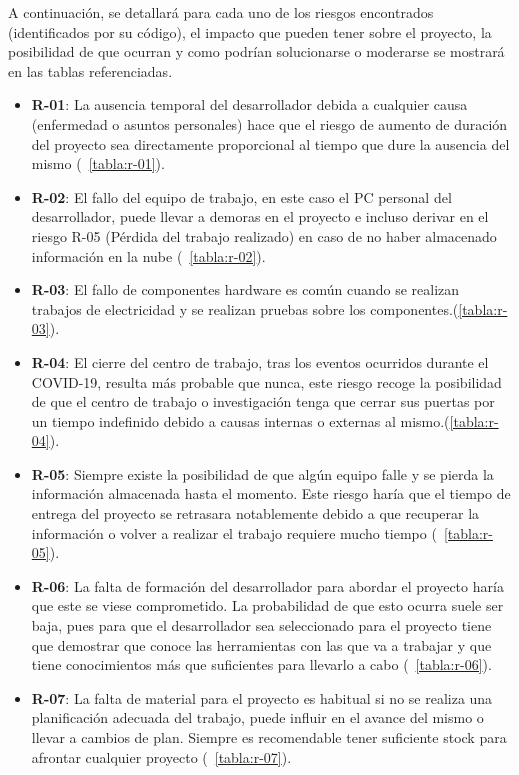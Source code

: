 A continuación, se detallará para cada uno de los riesgos encontrados (identificados por su código), el impacto que pueden tener sobre el proyecto, la posibilidad de que ocurran y como podrían solucionarse o moderarse se mostrará en las tablas referenciadas.

\begin{itemize}
    \item \textbf{R-01}: La ausencia temporal del desarrollador debida a cualquier causa (enfermedad o asuntos personales) hace que el riesgo de aumento de duración del proyecto sea directamente proporcional al tiempo que dure la ausencia del mismo (~\ref{tabla:r-01}).
    \item \textbf{R-02}: El fallo del equipo de trabajo, en este caso el PC personal del desarrollador, puede llevar a demoras en el proyecto e incluso derivar en el riesgo R-05 (Pérdida del trabajo realizado) en caso de no haber almacenado información en la nube (~\ref{tabla:r-02}).
    \item \textbf{R-03}: El fallo de componentes hardware es común cuando se realizan trabajos de electricidad y se realizan pruebas sobre los componentes.(\ref{tabla:r-03}).
    \item \textbf{R-04}: El cierre del centro de trabajo, tras los eventos ocurridos durante el COVID-19, resulta más probable que nunca, este riesgo recoge la posibilidad de que el centro de trabajo o investigación tenga que cerrar sus puertas por un tiempo indefinido debido a causas internas o externas al mismo.(\ref{tabla:r-04}).
    \item \textbf{R-05}: Siempre existe la posibilidad de que algún equipo falle y se pierda la información almacenada hasta el momento. Este riesgo haría que el tiempo de entrega del proyecto se retrasara notablemente debido a que recuperar la información o volver a realizar el trabajo requiere mucho tiempo (~\ref{tabla:r-05}).
    \item \textbf{R-06}: La falta de formación del desarrollador para abordar el proyecto haría que este se viese comprometido. La probabilidad de que esto ocurra suele ser baja, pues para que el desarrollador sea seleccionado para el proyecto tiene que demostrar que conoce las herramientas con las que va a trabajar y que tiene conocimientos más que suficientes para llevarlo a cabo (~\ref{tabla:r-06}).
    \item \textbf{R-07}: La falta de material para el proyecto es habitual si no se realiza una planificación adecuada del trabajo, puede influir en el avance del mismo o llevar a cambios de plan. Siempre es recomendable tener suficiente stock para afrontar cualquier proyecto (~\ref{tabla:r-07}).

\end{itemize}
